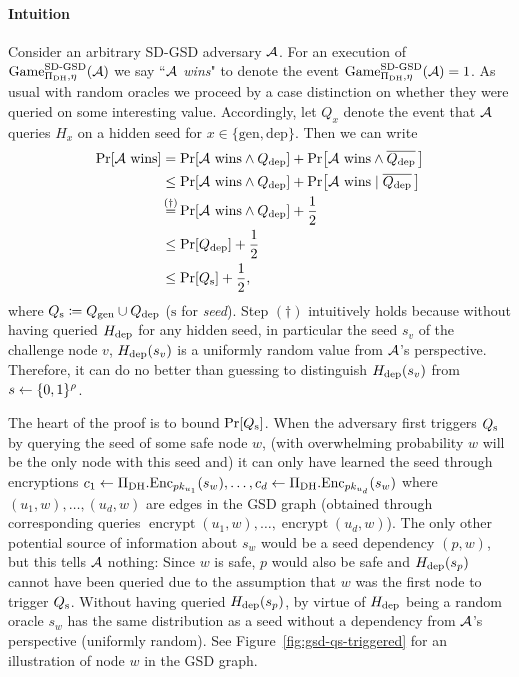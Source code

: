 \paragraph{Intuition}
Consider an arbitrary SD-GSD adversary $\mathcal{A}$. For an execution of $\mathrm{Game}_{\Pi_{\mathrm{DH}}, \eta}^{\mathrm{SD\text{-}GSD}}(\mathcal{A})$ we say ``\emph{$\mathcal{A}$ wins}" to denote the event $\mathrm{Game}_{\Pi_{\mathrm{DH}}, \eta}^{\mathrm{SD\text{-}GSD}}(\mathcal{A}) = 1$.
As usual with random oracles we proceed by a case distinction on whether they were queried on some interesting value. Accordingly, let $Q_{x}$ denote the event that $\mathcal{A}$ queries $H_{x}$ on a hidden seed for $x \in \{\mathrm{gen}, \mathrm{dep}\}$. Then we can write
\begin{align} \label{eq:theorem-sd-gsd-security-win-cases}
	\begin{split}
		\pr{\wins} & = \pr{\wins \land \qdep} + \pr{\wins \land \overline{\qdep} \,} \\
		& \le \pr{\wins \land \qdep} + \pr{\wins \mid \overline{\qdep} \,} \\
		& \stackrel{\mathclap{(\dagger)}}{=}  \pr{\wins \land \qdep} + \frac{1}{2}         \\
		& \le \pr{\qdep} + \frac{1}{2} \\
		& \le \pr{\qs} + \frac{1}{2},
	\end{split}
\end{align}
where $Q_\mathrm{s} \coloneqq Q_\mathrm{gen} \cup Q_\mathrm{dep}$ ($\mathrm{s}$ for \emph{seed}). Step $(\dagger)$ intuitively holds because without having queried $H_\mathrm{dep}$ for any hidden seed, in particular the seed $s_v$ of the challenge node $v$, $H_\mathrm{dep}(s_v)$ is a uniformly random value from $\mathcal{A}$'s perspective. Therefore, it can do no better than guessing to distinguish $H_\mathrm{dep}(s_v)$ from $s \leftarrow \{0, 1\}^\rho$. 

The heart of the proof is to bound $\pr{\qs}$. When the adversary first triggers $Q_\mathrm{s}$ by querying the seed of some safe node $w$, (with overwhelming probability $w$ will be the only node with this seed and) it can only have learned the seed through encryptions
$c_1 \leftarrow \Pi_{\mathrm{DH}}.\mathrm{Enc}_{pk_{u_1}}(s_w), \ldots, c_d \leftarrow \Pi_{\mathrm{DH}}.\mathrm{Enc}_{pk_{u_d}}(s_w)$
where $(u_1, w), \ldots, (u_d, w)$ are edges in the GSD graph (obtained through corresponding queries $\operatorname{encrypt}(u_1, w), \ldots, \operatorname{encrypt}(u_d, w)$). The only other potential source of information about $s_w$ would be a seed dependency $(p, w)$, but this tells $\mathcal{A}$ nothing: Since $w$ is safe, $p$ would also be safe and $H_\mathrm{dep}(s_p)$ cannot have been queried due to the assumption that $w$ was the first node to trigger $Q_\mathrm{s}$.
Without having queried $H_\mathrm{dep}(s_p)$, by virtue of $H_\mathrm{dep}$ being a random oracle $s_w$ has the same distribution as a seed without a dependency from $\mathcal{A}$'s perspective (uniformly random). See Figure~\ref{fig:gsd-qs-triggered} for an illustration of node $w$ in the GSD graph.

